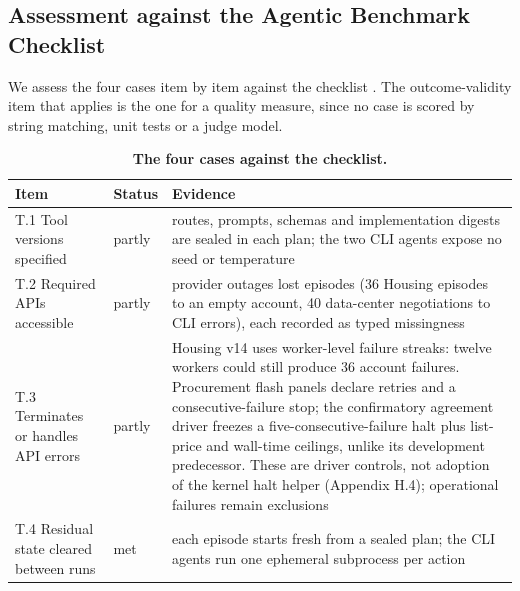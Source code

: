 \subsection{Assessment against the Agentic Benchmark Checklist}\label{assessment-against-the-agentic-benchmark-checklist}

We assess the four cases item by item against the checklist \citep{zhu2025abc}. The outcome-validity item that applies is the one
for a quality measure, since no case is scored by string matching, unit tests or a judge model.

\renewcommand{\thetable}{F.5}
\begin{longtable}[]{@{}
  >{\raggedright\arraybackslash}p{}
  >{\raggedright\arraybackslash}p{}
  >{\raggedright\arraybackslash}p{}@{}}
\caption{\textbf{The four cases against the checklist.}}\label{tab:F.5}\tabularnewline
\toprule\noalign{}
\begin{minipage}[b]{\linewidth}\raggedright
Item
\end{minipage} & \begin{minipage}[b]{\linewidth}\raggedright
Status
\end{minipage} & \begin{minipage}[b]{\linewidth}\raggedright
Evidence
\end{minipage} \\
\midrule\noalign{}
\endhead
\bottomrule\noalign{}
\endlastfoot
T.1 Tool versions specified & partly & routes, prompts, schemas and implementation digests are sealed in each plan; the two CLI agents expose no seed or temperature \\
T.2 Required APIs accessible & partly & provider outages lost episodes (36 Housing episodes to an empty account, 40 data-center negotiations to CLI errors), each recorded as typed missingness \\
T.3 Terminates or handles API errors & partly & Housing v14 uses worker-level failure streaks: twelve workers could still produce 36 account failures. Procurement flash panels declare retries and a consecutive-failure stop; the confirmatory agreement driver freezes a five-consecutive-failure halt plus list-price and wall-time ceilings, unlike its development predecessor. These are driver controls, not adoption of the kernel halt helper (Appendix H.4); operational failures remain exclusions \\
T.4 Residual state cleared between runs & met & each episode starts fresh from a sealed plan; the CLI agents run one ephemeral subprocess per action \\

\end{longtable}
